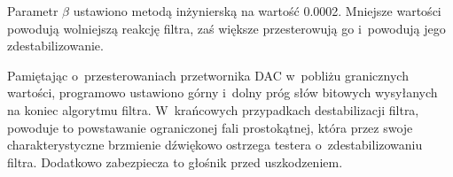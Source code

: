 Parametr $\beta$ ustawiono metodą inżynierską na wartość 0.0002. Mniejsze wartości powodują wolniejszą reakcję filtra, zaś większe przesterowują go i~powodują jego zdestabilizowanie.

Pamiętając o~przesterowaniach przetwornika DAC w~pobliżu granicznych wartości, programowo ustawiono górny i~dolny próg słów bitowych wysyłanych na koniec algorytmu filtra. W~krańcowych przypadkach destabilizacji filtra, powoduje to powstawanie ograniczonej fali prostokątnej, która przez swoje charakterystyczne brzmienie dźwiękowo ostrzega testera o~zdestabilizowaniu filtra. Dodatkowo zabezpiecza to głośnik przed uszkodzeniem.